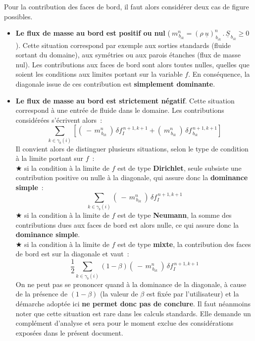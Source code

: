 \hspace*{1cm}Pour la contribution des faces de bord, il faut alors considérer deux cas de
figure possibles.
\begin{itemize}

\item {\bf Le flux de masse au bord est positif ou nul}
($\ m_{\,{b}_{ik}}^n = (\rho\
\underline{u})^{n}_{\,b_{ik}}\,.\,\underline{S}_{\,b_{ik}} \geqslant 0$). Cette
situation correspond par exemple aux sorties standards (fluide sortant du
domaine), aux symétries ou aux parois étanches (flux de masse nul). Les contributions aux
faces de bord sont alors toutes nulles, quelles que soient les conditions aux limites
portant sur la variable $f$. En conséquence, la diagonale issue de ces
contribution est {\bf simplement dominante}.
\hspace*{0.5cm}
\item {\bf Le flux de masse au bord est strictement négatif}. Cette situation
correspond à une entrée de fluide dans
le domaine. Les contributions considérées s'écrivent alors~:
\begin{equation}
\displaystyle\sum\limits_{k\in {\gamma_b(i)}}\left[(\ -\,
m_{\,{b}_{ik}}^n\ )\,\delta f_I^{\,n+1,k+1} + (\
m_{\,{b}_{ik}}^n\ )\,\delta f_{\,{b}_{ik}}^{\,n+1,k+1}\right]
\end{equation}
Il convient alors de distinguer plusieurs situations, selon le type de condition
à la limite portant sur $f$~: \\
\hspace*{1.cm} {\tiny$\bigstar$} si la condition à la limite de $f$ est de type
{\bf Dirichlet}, seule subsiste une contribution positive ou nulle à la diagonale, qui assure
donc la {\bf dominance simple}~:
\begin{equation}
\displaystyle\sum\limits_{k\in {\gamma_b(i)}}(\ -\,
m_{\,{b}_{ik}}^n\ )\,\delta f_I^{\,n+1,k+1}
\end{equation}
\hspace*{1.cm} {\tiny$\bigstar$} si la condition à la limite de $f$ est de type
 {\bf Neumann}, la somme des contributions dues aux faces de bord
est alors nulle, ce qui assure
donc la {\bf dominance simple}.\\
\hspace*{1.cm} {\tiny$\bigstar$} si la condition à la limite de $f$ est de type
{\bf mixte}, la contribution des faces de bord est sur la diagonale et vaut~:
\begin{equation}
\displaystyle \frac{1}{2}\sum\limits_{k \in \gamma_b(i)}(1-\beta)
(\ -\,m_{\,{b}_{ik}}^n\ )\,\delta f_I^{\,n+1,k+1}
\end{equation}
On ne peut pas se prononcer quand à la dominance de la diagonale, à
cause de la présence de $(1-\beta)$ (la valeur de $\beta$ est fixée par
l'utilisateur) et la démarche adoptée ici
{\bf ne permet donc pas de conclure}. Il faut néanmoins noter que cette
situation est rare dans les calculs standards. Elle demande un
complément d'analyse et sera pour le moment exclue des
considérations exposées dans le présent document.\\
\end{itemize}

